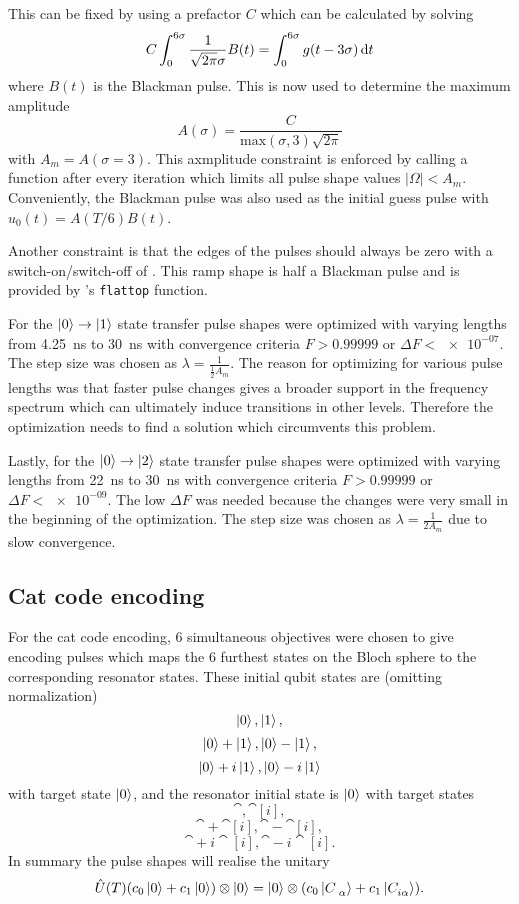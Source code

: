 \documentclass[main.tex]{subfiles}
\begin{document}
This can be fixed by using a prefactor \(C\) which can be calculated by solving
\begin{equation}
    C \int_0^{6\sigma}\frac{1}{\sqrt{2\pi}\sigma} B(t) = \int_0^{6\sigma}g(t-3\sigma)\,\mathrm{d} t
\end{equation}
where \(B(t)\) is the Blackman pulse.
This is now used to determine the maximum amplitude
\begin{equation}
    A(\sigma) = \frac{C}{\text{max}(\sigma,3)\sqrt{2\pi}}
\end{equation}
with \(A_m = A(\sigma = 3)\). 
This axmplitude constraint is enforced by calling a function after every iteration which limits all pulse shape values \(|\Omega| < A_m\).
Conveniently, the Blackman pulse was also used as the initial guess pulse with \(u_0(t) = A(T/6)B(t)\).

Another constraint is that the edges of the pulses should always be zero with a switch-on/switch-off of .
This ramp shape is half a Blackman pulse and is provided by \krotov{}'s \texttt{flattop} function.

For the \(\ket{0}\rightarrow\ket{1}\) state transfer pulse shapes were optimized with varying lengths from \SI{4.25}{\nano\second} to \SI{30}{\nano\second} with convergence criteria \(F>0.99999\) or \(\Delta F < \num{e-07}\).
The step size was chosen as \(\lambda = \frac{1}{\frac{1}{2}A_{m}}\).
The reason for optimizing for various pulse lengths was that faster pulse changes gives a broader support in the frequency spectrum which can ultimately induce transitions in other levels.
Therefore the optimization needs to find a solution which circumvents this problem.

Lastly, for the \(\ket{0}\rightarrow\ket{2}\) state transfer pulse shapes were optimized with varying lengths from \SI{22}{\nano\second} to \SI{30}{\nano\second} with convergence criteria \(F>0.99999\) or \(\Delta F < \num{e-09}\).
The low \(\Delta F\) was needed because the changes were very small in the beginning of the optimization.
The step size was chosen as \(\lambda = \frac{1}{2A_{m}}\) due to slow convergence.

\subsection{Cat code encoding}
For the cat code encoding, 6 simultaneous objectives were chosen to give encoding pulses which maps the 6 furthest states on the Bloch sphere to the corresponding resonator states.
These initial qubit states are (omitting normalization)
\[ \ket{0}, \ket{1},\]
\[ \ket{0}+\ket{1}, \ket{0}-\ket{1},\]
\[ \ket{0}+i\ket{1}, \ket{0}-i\ket{1} \]
with target state \(\ket{0}\),
and the resonator initial state is \(\ket{0}\) with target states
\[ \cat{}, \cat[i]{},\]
\[ \cat{}+\cat[i]{}, \cat{}-\cat[i]{},\]
\[ \cat{}+i\cat[i]{}, \cat{}-i\cat[i]{}. \]
In summary the pulse shapes will realise the unitary
\begin{equation}
    \hat{U}(T) \qty(c_0\ket{0}+c_1\ket{0})\otimes\ket{0} = \ket{0}\otimes\qty(c_0\cat{}+c_1\cat[i]{}).
\end{equation}
\end{document}
